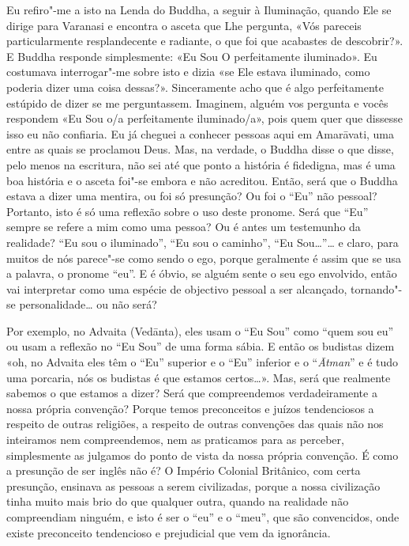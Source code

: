 Eu refiro"-me a isto na Lenda do Buddha, a seguir à Iluminação, quando
Ele se dirige para Varanasi e encontra o asceta que Lhe pergunta, «Vós
pareceis particularmente resplandecente e radiante, o que foi que
acabastes de descobrir?». E Buddha responde simplesmente: «Eu Sou O
perfeitamente iluminado». Eu costumava interrogar"-me sobre isto e dizia
«se Ele estava iluminado, como poderia dizer uma coisa dessas?».
Sinceramente acho que é algo perfeitamente estúpido de dizer se me
perguntassem. Imaginem, alguém vos pergunta e vocês respondem «Eu Sou
o/a perfeitamente iluminado/a», pois quem quer que dissesse isso eu não
confiaria. Eu já cheguei a conhecer pessoas aqui em Amarāvati, uma entre
as quais se proclamou Deus. Mas, na verdade, o Buddha disse o que disse,
pelo menos na escritura, não sei até que ponto a história é fidedigna,
mas é uma boa história e o asceta foi"-se embora e não acreditou. Então,
será que o Buddha estava a dizer uma mentira, ou foi só presunção? Ou
foi o ``Eu'' não pessoal? Portanto, isto é só uma reflexão sobre o uso
deste pronome. Será que ``Eu'' sempre se refere a mim como uma pessoa?
Ou é antes um testemunho da realidade? ``Eu sou o iluminado'', ``Eu sou
o caminho'', ``Eu Sou\ldots{}''\ldots{} e claro, para muitos de nós parece"-se como
sendo o ego, porque geralmente é assim que se usa a palavra, o pronome
``eu''. E é óbvio, se alguém sente o seu ego envolvido, então vai
interpretar como uma espécie de objectivo pessoal a ser alcançado,
tornando"-se personalidade\ldots{} ou não será?

Por exemplo, no Advaita (Vedānta), eles usam o ``Eu Sou'' como ``quem
sou eu'' ou usam a reflexão no ``Eu Sou'' de uma forma sábia. E então os
budistas dizem «oh, no Advaita eles têm o ``Eu'' superior e o ``Eu''
inferior e o ``\emph{Ātman}'' e é tudo uma porcaria, nós os budistas é
que estamos certos\ldots{}». Mas, será que realmente sabemos o que estamos a
dizer? Será que compreendemos verdadeiramente a nossa própria convenção?
Porque temos preconceitos e juízos tendenciosos a respeito de outras
religiões, a respeito de outras convenções das quais não nos inteiramos
nem compreendemos, nem as praticamos para as perceber, simplesmente as
julgamos do ponto de vista da nossa própria convenção. É como a
presunção de ser inglês não é? O Império Colonial Britânico, com certa
presunção, ensinava as pessoas a serem civilizadas, porque a nossa
civilização tinha muito mais brio do que qualquer outra, quando na
realidade não compreendiam ninguém, e isto é ser o ``eu'' e o ``meu'',
que são convencidos, onde existe preconceito tendencioso e prejudicial
que vem da ignorância.

